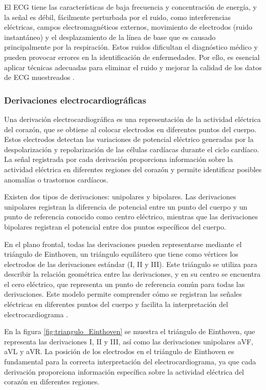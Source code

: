     El ECG tiene las características de baja frecuencia y concentración de energía, y la señal es débil, fácilmente perturbada por el ruido, como interferencias eléctricas, campos electromagnéticos externos, movimiento de electrodos (ruido instantáneo)  y el desplazamiento de la línea de base que es causado principalmente por la respiración. Estos ruidos dificultan el diagnóstico médico y pueden provocar errores en la identificación de enfermedades. Por ello, es esencial aplicar técnicas adecuadas para eliminar el ruido y mejorar la calidad de los datos de ECG muestreados \cite{AlMahamdy_2014}.

        \subsubsection{Derivaciones electrocardiográficas}
        Una derivación electrocardiográfica es una representación de la actividad eléctrica del corazón, que se obtiene al colocar electrodos en diferentes puntos del cuerpo. Estos electrodos detectan las variaciones de potencial eléctrico generadas por la despolarización y repolarización de las células cardíacas durante el ciclo cardíaco. La señal registrada por cada derivación proporciona información sobre la actividad eléctrica en diferentes regiones del corazón y permite identificar posibles anomalías o trastornos cardíacos.

        Existen dos tipos de derivaciones: unipolares y bipolares. Las derivaciones unipolares registran la diferencia de potencial entre un punto del cuerpo y un punto de referencia conocido como centro eléctrico, mientras que las derivaciones bipolares registran el potencial entre dos puntos específicos del cuerpo.

        En el plano frontal, todas las derivaciones pueden representarse mediante el triángulo de Einthoven, un triángulo equilátero que tiene como vértices los electrodos de las derivaciones estándar (I, II y III). Este triángulo se utiliza para describir la relación geométrica entre las derivaciones, y en su centro se encuentra el cero eléctrico, que representa un punto de referencia común para todas las derivaciones. Este modelo permite comprender cómo se registran las señales eléctricas en diferentes puntos del cuerpo y facilita la interpretación del electrocardiograma \cite{mauricio_2008}.

        En la figura \ref{fig:triangulo_Einthoven} se muestra el triángulo de Einthoven, que representa las derivaciones I, II y III, así como las derivaciones unipolares aVF, aVL y aVR. La posición de los electrodos en el triángulo de Einthoven es fundamental para la correcta interpretación del electrocardiograma, ya que cada derivación proporciona información específica sobre la actividad eléctrica del corazón en diferentes regiones.

